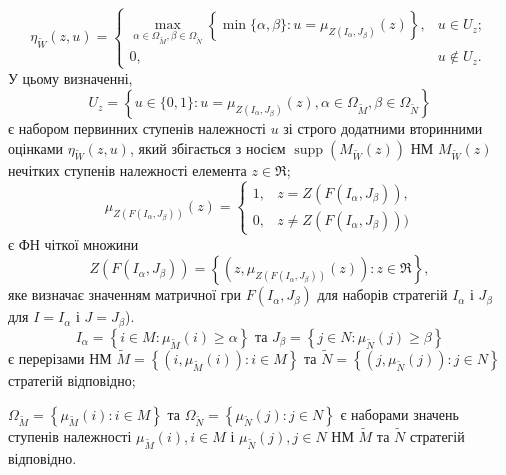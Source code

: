 \documentclass[14pt, a4paper, oneside]{extarticle}
\numberwithin{equation}{section}
\begin{document}
\begin{equation*}
\eta_{\tilde{W}}(z, u)=\left\{\begin{array}{cc}
\max _{\alpha \in \Omega_{\tilde{M}}, \beta \in \Omega_{\tilde{N}}}\left\{\min \{\alpha, \beta\}: u=\mu_{Z\left(I_{\alpha}, J_{\beta}\right)}(z)\right\}, & u \in U_{z} ;\\
0, & u \notin U_{z} .
\end{array}\right.
\end{equation*}
У цьому визначенні,
\begin{equation*}
U_{z}=\left\{u \in\{0,1\}: u=\mu_{Z\left(I_{\alpha}, J_{\beta}\right)}(z), \alpha \in \Omega_{\tilde{M}}, \beta \in \Omega_{\tilde{N}}\right\}
\end{equation*}
є набором первинних ступенів належності $u$ зі строго додатними вторинними оцінками $\eta_{\tilde{W}}(z, u)$, який збігається з носієм $\operatorname{supp}\left(M_{\tilde{W}}(z)\right)$ НМ $M_{\tilde{W}}(z)$ нечітких ступенів належності елемента $z \in \Re$;
\begin{equation*}
\mu_{Z\left(F\left(I_{\alpha}, J_{\beta}\right)\right)}(z)=
\begin{cases} 
1, & z = Z\left(F\left(I_{\alpha}, J_{\beta}\right)\right), \\
0, & z \neq Z\left(F\left(I_{\alpha}, J_{\beta}\right)\right))
\end{cases}
\end{equation*}
є ФН чіткої множини
\begin{equation*}
Z\left(F\left(I_{\alpha}, J_{\beta}\right)\right)=\left\{\left(z, \mu_{Z\left(F\left(I_{\alpha}, J_{\beta}\right)\right)}(z)\right): z \in \Re\right\},
\end{equation*}
яке визначає значенням матричної гри $F\left(I_{\alpha}, J_{\beta}\right)$ для наборів стратегій $I_{\alpha}$ і $J_{\beta}$ для $I=I_{\alpha}$ і $J=J_{\beta}$).
\begin{equation*}
I_{\alpha}=\left\{i \in M: \mu_{\tilde{M}}(i) \geq \alpha\right\} \text { та } J_{\beta}=\left\{j \in N: \mu_{\tilde{N}}(j) \geq \beta\right\}
\end{equation*}
є перерізами НМ $\tilde{M}=\left\{\left(i, \mu_{\tilde{M}}(i)\right): i \in M\right\}$ та $\tilde{N}=\left\{\left(j, \mu_{\tilde{N}}(j)\right): j \in N\right\}$ стратегій відповідно;

$\Omega_{\tilde{M}}=\left\{\mu_{\tilde{M}}(i): i \in M\right\}$ та $\Omega_{\tilde{N}}=\left\{\mu_{\tilde{N}}(j): j \in N\right\}$ є наборами значень ступенів належності $\mu_{\tilde{M}}(i), i \in M$ і $\mu_{\tilde{N}}(j), j \in N$ НМ $\tilde{M}$ та $\tilde{N}$ стратегій відповідно.
\end{document}
